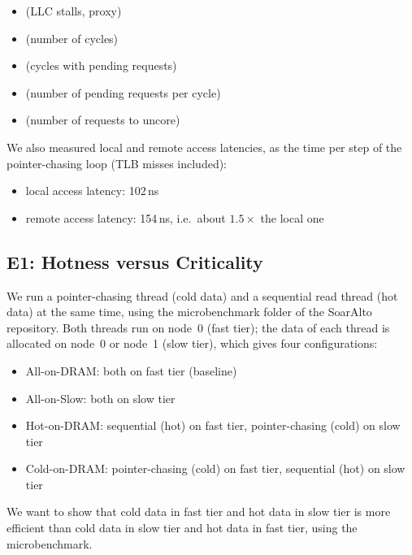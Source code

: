 \documentclass[10pt,a4paper]{article}
\begin{document}
\begin{itemize}
    \item {} (LLC stalls, proxy)
    \item {} (number of cycles)
    \item {} (cycles with pending requests)
    \item {} (number of pending requests per cycle)
    \item {} (number of requests to uncore)
\end{itemize}

We also measured local and remote access latencies, as the time per step of the pointer-chasing loop (TLB misses included):

\begin{itemize}
    \item local access latency: 102\,ns
    \item remote access latency: 154\,ns, i.e.\ about $1.5\times$ the local one
\end{itemize}


\subsection{E1: Hotness versus Criticality}
We run a pointer-chasing thread (cold data) and a sequential read thread (hot data) at the same time, using the microbenchmark folder of the SoarAlto repository. Both threads run on node~0 (fast tier); the data of each thread is allocated on node~0 or node~1 (slow tier), which gives four configurations:

\begin{itemize}
    \item All-on-DRAM: both on fast tier (baseline)
    \item All-on-Slow: both on slow tier
    \item Hot-on-DRAM: sequential (hot) on fast tier, pointer-chasing (cold) on slow tier
    \item Cold-on-DRAM: pointer-chasing (cold) on fast tier, sequential (hot) on slow tier
\end{itemize}

We want to show that cold data in fast tier and hot data in slow tier is more efficient than cold data in slow tier and hot data in fast tier, using the microbenchmark.
\end{document}
